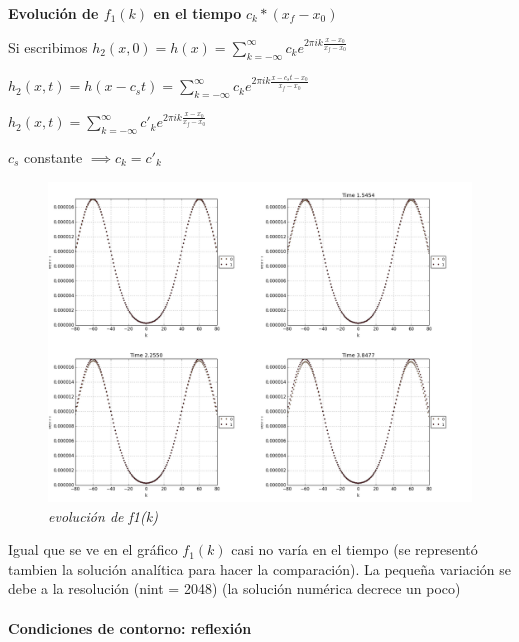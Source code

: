 \documentclass{article}
\begin{document}
\textbf{Evolución de $f_1(k)$ en el tiempo}  $c_k * (x_f - x_0)$
\begin{description}
\item Si escribimos   $h_2(x,0) = h(x) = \sum_{k=-\infty}^{\infty}c_k e^{2 \pi i k \frac{x-x_0}{x_f-x_0}}$ 
\item $h_2(x,t) = h(x-c_s t) = \sum_{k=-\infty}^{\infty}c_k e^{2 \pi i k \frac{x-c_s t-x_0}{x_f-x_0}}$ 
\item $h_2(x,t)  = \sum_{k=-\infty}^{\infty}c\prime_k e^{2 \pi i k \frac{x-x_0}{x_f-x_0}}$
\item $c_s$ constante $\implies c_k = c\prime_k$  

\item \begin{figure}[!ht]
 \centering
 \includegraphics[scale=0.2]{fourhom.png}
 \caption{\emph{evolución de f1(k)}}
\end{figure}
\item Igual que se ve en el gráfico $f_1(k) $ casi no varía en el tiempo (se representó tambien la solución analítica para hacer la comparación).
La pequeña variación se debe a la resolución (nint = 2048) (la solución numérica decrece un poco)


\end{description}

\paragraph{Condiciones de contorno: reflexión}
\end{document}
